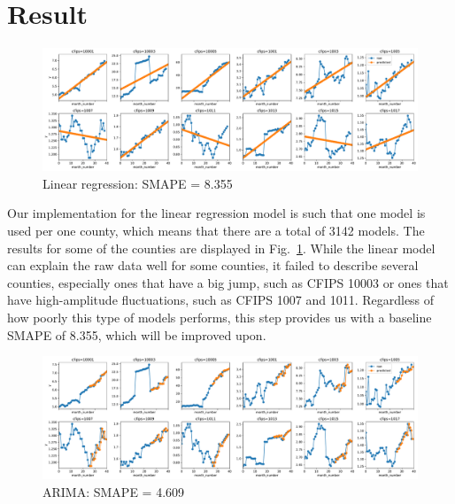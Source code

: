 \documentclass[prl,aps,superscriptaddress,twocolumn,10pt,nolongbibliography]{revtex4-2}
\begin{document}

\section{Result}
\begin{figure}
\includegraphics[width=7in]{figs/linear.pdf}
\caption{\label{fig:linear}
Linear regression: SMAPE = 8.355
}
\end{figure}

Our implementation for the linear regression model is such that one model is used per one county, which means that there are a total of 3142 models. 
The results for some of the counties are displayed in Fig.~\ref{fig:linear}.
While the linear model can explain the raw data well for some counties, it failed to describe several counties, especially ones that have a big jump, such as CFIPS 10003 or ones that have high-amplitude fluctuations, such as CFIPS 1007 and 1011. 
Regardless of how poorly this type of models performs, this step provides us with a baseline SMAPE of 8.355, which will be improved upon.

\begin{figure}
\includegraphics[width=7in]{figs/arima.pdf}
\caption{\label{fig:arima}
ARIMA: SMAPE = 4.609
}
\end{figure}
\end{document}

